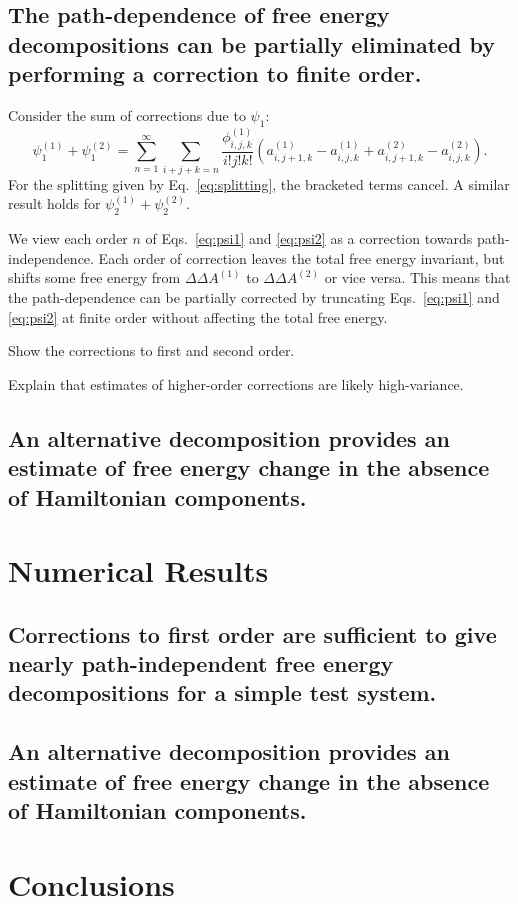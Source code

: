 \documentclass{article}
\begin{document}
\subsection{The path-dependence of free energy decompositions can be partially eliminated by performing a correction to finite order.}

Consider the sum of corrections due to $\psi_1$:
\begin{equation}
\psi_1^{(1)} + \psi_1^{(2)} =
	\sum_{n=1}^{\infty}
    \sum_{i+j+k=n}
        \frac{\phi_{i,j,k}^{(1)}}{i!j!k!}
        \left(
            a_{i,j+1,k}^{(1)} -
            a_{i,j,k}^{(1)} +
            a_{i,j+1,k}^{(2)} -
            a_{i,j,k}^{(2)}
        \right).
\end{equation}
For the splitting given by Eq.~\ref{eq:splitting}, the bracketed terms cancel. A similar result holds for $\psi_2^{(1)} + \psi_2^{(2)}$.

We view each order $n$ of Eqs.~\ref{eq:psi1} and \ref{eq:psi2} as a correction towards path-independence. Each order of correction leaves the total free energy invariant, but shifts some free energy from $\Delta\Delta A^{(1)}$ to $\Delta\Delta A^{(2)}$ or vice versa. This means that the path-dependence can be partially corrected by truncating Eqs.~\ref{eq:psi1} and \ref{eq:psi2} at finite order without affecting the total free energy.

Show the corrections to first and second order.

Explain that estimates of higher-order corrections are likely high-variance.



\subsection*{An alternative decomposition provides an estimate of free energy change in the absence of Hamiltonian components.}





\section{Numerical Results}

\subsection{Corrections to first order are sufficient to give nearly path-independent free energy decompositions for a simple test system.}

\subsection{An alternative decomposition provides an estimate of free energy change in the absence of Hamiltonian components.}


\section{Conclusions}
\end{document}
